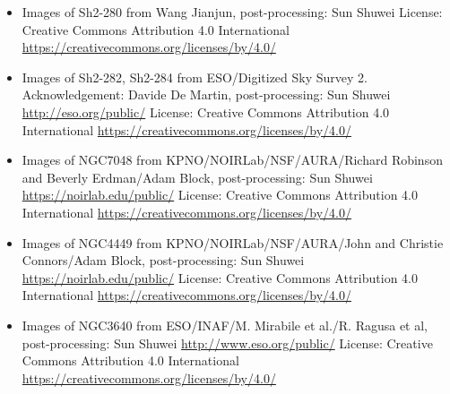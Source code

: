 \begin{itemize}
	 License: Creative Commons Attribution-Share Alike 4.0 International \url{https://creativecommons.org/licenses/by-sa/4.0/}
\item Images of Sh2-280
	 from Wang Jianjun, post-processing: Sun Shuwei
	 License: Creative Commons Attribution 4.0 International \url{https://creativecommons.org/licenses/by/4.0/}
\item Images of Sh2-282, Sh2-284
	 from ESO/Digitized Sky Survey 2. Acknowledgement: Davide De Martin, post-processing: Sun Shuwei
	 \url{http://eso.org/public/}
	 License: Creative Commons Attribution 4.0 International \url{https://creativecommons.org/licenses/by/4.0/}
\item Images of NGC7048
	 from KPNO/NOIRLab/NSF/AURA/Richard Robinson and Beverly Erdman/Adam Block, post-processing: Sun Shuwei
	 \url{https://noirlab.edu/public/}
	 License: Creative Commons Attribution 4.0 International \url{https://creativecommons.org/licenses/by/4.0/}
\item Images of NGC4449
	 from KPNO/NOIRLab/NSF/AURA/John and Christie Connors/Adam Block, post-processing: Sun Shuwei
	 \url{https://noirlab.edu/public/}
	 License: Creative Commons Attribution 4.0 International \url{https://creativecommons.org/licenses/by/4.0/}
\item Images of NGC3640
	 from ESO/INAF/M. Mirabile et al./R. Ragusa et al, post-processing: Sun Shuwei
	 \url{http://www.eso.org/public/}
	 License: Creative Commons Attribution 4.0 International \url{https://creativecommons.org/licenses/by/4.0/}


\end{itemize}

